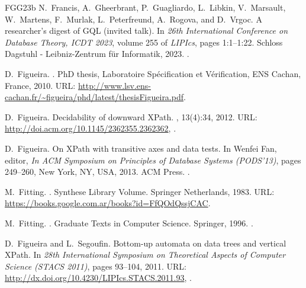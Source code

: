 \documentclass[10pt,a4paper]{amsart}
\theoremstyle{definition}
\theoremstyle{remark}
\begin{document}
\begin{thebibliography}{FGG{\etalchar{+}}23b}
N.~Francis, A.~Gheerbrant, P.~Guagliardo, L.~Libkin, V.~Marsault, W.~Martens, F.~Murlak, L.~Peterfreund, A.~Rogova, and D.~Vrgoc.
\newblock A researcher's digest of {GQL} (invited talk).
\newblock In {\em 26th International Conference on Database Theory, {ICDT} 2023}, volume 255 of {\em LIPIcs}, pages 1:1--1:22. Schloss Dagstuhl - Leibniz-Zentrum f{\"{u}}r Informatik, 2023.
\newblock \href {https://doi.org/10.4230/LIPICS.ICDT.2023.1} {}.

D.~Figueira.
.
\newblock Ph{D} thesis, Laboratoire Sp{\'e}cification et V{\'e}rification, ENS Cachan, France, 2010.
\newblock URL: \url{http://www.lsv.ens-cachan.fr/~figueira/phd/latest/thesisFigueira.pdf}.

D.~Figueira.
\newblock Decidability of downward {{XP}ath}.
, 13(4):34, 2012.
\newblock URL: \url{http://doi.acm.org/10.1145/2362355.2362362}, \href {https://doi.org/10.1145/2362355.2362362} {}.

D.~Figueira.
\newblock On {XP}ath with transitive axes and data tests.
\newblock In Wenfei Fan, editor, {\em In {ACM} {S}ymposium on Principles of Database Systems ({PODS}'13)}, pages 249--260, New York, NY, USA, 2013. ACM Press.
\newblock \href {https://doi.org/10.1145/2463664.2463675} {}.

M.~Fitting.
.
\newblock Synthese Library Volume. Springer Netherlands, 1983.
\newblock URL: \url{https://books.google.com.ar/books?id=FfQOdQssjCAC}.

M.~Fitting.
.
\newblock Graduate Texts in Computer Science. Springer, 1996.
\newblock \href {https://doi.org/10.1007/978-1-4612-2360-3} {}.

D.~Figueira and L.~Segoufin.
\newblock Bottom-up automata on data trees and vertical {XP}ath.
\newblock In {\em 28th International Symposium on Theoretical Aspects of Computer Science ({STACS} 2011)}, pages 93--104, 2011.
\newblock URL: \url{http://dx.doi.org/10.4230/LIPIcs.STACS.2011.93}, \href {https://doi.org/10.4230/LIPIcs.STACS.2011.93} {}.


\end{thebibliography}
\end{document}
